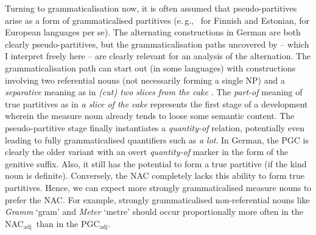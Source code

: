 \documentclass[USenglish]{article}
\newcommand{\eg}{e.\,g.,}
\newcommand{\Sub}[1]{\ensuremath{\mathrm{_{#1}}}}
\newcommand{\NACa}{NAC\Sub{adj}}
\newcommand{\PGCa}{PGC\Sub{adj}}
\begin{document}
Turning to grammaticalisation now, it is often assumed that pseudo-partitives arise as a form of grammaticalised partitives (\eg\ \citealp[536--539]{Koptjevskaja2001} for Finnish and Estonian, \citealp[559]{Koptjevskaja2001} for European languages per se).
%
%
%
%
The alternating constructions in German are both clearly pseudo-partitives, but the grammaticalisation paths uncovered by \cite[esp.\ 526--530]{Koptjevskaja2001} -- which I interpret freely here -- are clearly relevant for an analysis of the alternation.
The grammaticalisation path can start out (in some languages) with constructions involving two referential nouns (not necessarily forming a single NP) and a \textit{separative} meaning as in \textit{(cut) two slices from the cake} \citep[535]{Koptjevskaja2001}.
The \textit{part-of} meaning of true partitives as in \textit{a slice of the cake} represents the first stage of a development wherein the measure noun already tends to loose some semantic content.
The pseudo-partitive stage finally instantiates a \textit{quantity-of} relation, potentially even leading to fully grammaticalised quantifiers such as \textit{a lot}.
In German, the PGC is clearly the older variant \citep{Zimmer2015} with an overt \textit{quantity-of} marker in the form of the genitive suffix.
Also, it still has the potential to form a true partitive (if the kind noun is definite).
Conversely, the NAC completely lacks this ability to form true partitives.
Hence, we can expect more strongly grammaticalised measure nouns to prefer the NAC.
For example, strongly grammaticalised non-referential nouns like \textit{Gramm} `gram' and \textit{Meter} `metre' should occur proportionally more often in the \NACa\ than in the \PGCa.
\end{document}
